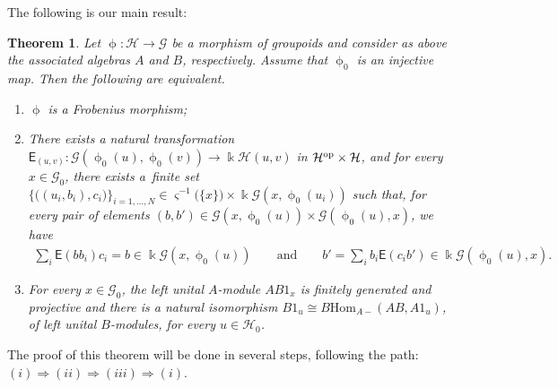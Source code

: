 \documentclass[pdftex]{sigma}
\numberwithin{equation}{section}
\newtheorem{Theorem}{Theorem}[section]
\newcommand{\Sf}[1]{\mathsf{#1}}
\renewcommand{\hom}[3]{\mathrm{Hom}_{\Sscript{#1}}\left(#2, #3\right)}
\newcommand{\Go}{\cG_{\Sscript{0}}}
\newcommand{\Ho}{\cH_{\Sscript{0}}}
\newcommand{\cG}{{\mathcal G}}
\newcommand{\cH}{{\mathcal H}}
\newcommand{\Sscript}[1]{\scriptscriptstyle{#1}}
\newcommand{\phio}{\upphi_{\Sscript{0}}}
\begin{document}
The following is our main result:
\begin{Theorem}\label{thm:FM}Let $\upphi\colon \cH \to \cG$ be a morphism of groupoids and consider as above the associated algebras $A$ and $B$, respectively. Assume that $\upphi_{\Sscript{0}}$ is an injective map. Then the following are equivalent.
\begin{enumerate}[$(i)$]\itemsep=0pt
\item $\upphi$ is a Frobenius morphism;
\item There exists a natural transformation $\Sf{E}_{\Sscript{(u, v)}}\colon \cG(\phio(u),\phio(v)) \longrightarrow \Bbbk \cH(u,v)$ in $\cH^{\rm op} \times \cH$, and for every $x \in \Go$, there exists a~finite set
$\{\big((u_{i},b_{i}), c_{i}\big)\}_{i=1, \dots, N} \in \varsigma^{-1}\big( \{x\}\big)\times \Bbbk \cG(x, \phio(u_{i}))$ such that, for every pair of elements $ (b, b') \in \cG(x, \phio(u)) \times \cG(\phio(u), x)$, we have
\begin{gather*}
\sum_{i}\Sf{E}(bb_{i})c_{i} = b \in \Bbbk \cG(x, \phio(u)) \qquad \text{and} \qquad b' = \sum_{i}b_{i}\Sf{E}(c_{i}b') \in \Bbbk \cG(\phio(u), x).
\end{gather*}
\item For every $x\in \Go$, the left unital $A$-module $AB1_{x}$ is finitely generated and projective and there is a natural isomorphism $B1_{u} \cong B\hom{A-}{AB}{A1_{u}}$, of left unital $B$-modules, for every $u\in \Ho$.
\end{enumerate}
\end{Theorem}

The proof of this theorem will be done in several steps, following the path: $(i) \Rightarrow (ii) \Rightarrow (iii) \Rightarrow (i)$.
\end{document}
